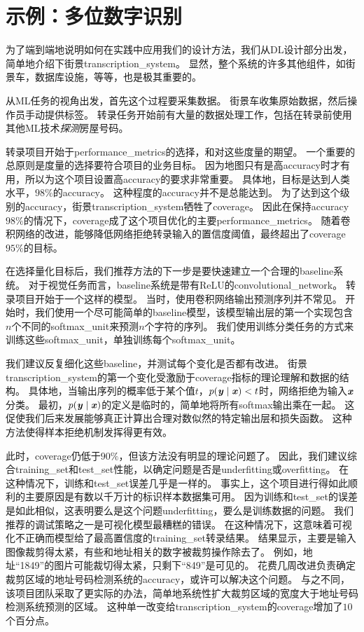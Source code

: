 \section{示例：多位数字识别}
\label{sec:example_multi_digit_number_recognition}
为了端到端地说明如何在实践中应用我们的设计方法，我们从\gls{DL}设计部分出发，简单地介绍下街景\gls{transcription_system}。
显然，整个系统的许多其他组件，如街景车，数据库设施，等等，也是极其重要的。

从\gls{ML}任务的视角出发，首先这个过程要采集数据。
街景车收集原始数据，然后操作员手动提供标签。
转录任务开始前有大量的数据处理工作，包括在转录前使用其他\gls{ML}技术\emph{探测}房屋号码。

转录项目开始于\gls{performance_metrics}的选择，和对这些度量的期望。
一个重要的总原则是度量的选择要符合项目的业务目标。
因为地图只有是高\gls{accuracy}时才有用，所以为这个项目设置高\gls{accuracy}的要求非常重要。
具体地，目标是达到人类水平，$98\%$的\gls{accuracy}。
这种程度的\gls{accuracy}并不是总能达到。
为了达到这个级别的\gls{accuracy}，街景\gls{transcription_system}牺牲了\gls{coverage}。
因此在保持\gls{accuracy} $98\%$的情况下，\gls{coverage}成了这个项目优化的主要\gls{performance_metrics}。
随着卷积网络的改进，能够降低网络拒绝转录输入的置信度阈值，最终超出了\gls{coverage} $95\%$的目标。


在选择量化目标后，我们推荐方法的下一步是要快速建立一个合理的\gls{baseline}系统。
对于视觉任务而言，\gls{baseline}系统是带有\gls{ReLU}的\gls{convolutional_network}。
转录项目开始于一个这样的模型。
当时，使用卷积网络输出预测序列并不常见。
开始时，我们使用一个尽可能简单的\gls{baseline}模型，该模型输出层的第一个实现包含$n$个不同的\gls{softmax_unit}来预测$n$个字符的序列。
我们使用训练分类任务的方式来训练这些\gls{softmax_unit}，单独训练每个\gls{softmax_unit}。


我们建议反复细化这些\gls{baseline}，并测试每个变化是否都有改进。
街景\gls{transcription_system}的第一个变化受激励于\gls{coverage}指标的理论理解和数据的结构。
具体地，当输出序列的概率低于某个值$t$，$p(\boldsymbol{\mathit{y}}\mid\boldsymbol{\mathit{x}}) < t$时，网络拒绝为输入$\boldsymbol{\mathit{x}}$分类。
最初，$p(\boldsymbol{\mathit{y}}\mid\boldsymbol{\mathit{x}})$的定义是临时的，简单地将所有\gls{softmax}输出乘在一起。
这促使我们后来发展能够真正计算出合理对数似然的特定输出层和损失函数。
这种方法使得样本拒绝机制发挥得更有效。


此时，\gls{coverage}仍低于$90\%$，但该方法没有明显的理论问题了。
因此，我们建议综合\gls{training_set}和\gls{test_set}性能，以确定问题是否是\gls{underfitting}或\gls{overfitting}。
在这种情况下，训练和\gls{test_set}误差几乎是一样的。
事实上，这个项目进行得如此顺利的主要原因是有数以千万计的标识样本数据集可用。
因为训练和\gls{test_set}的误差是如此相似，这表明要么是这个问题\gls{underfitting}，要么是训练数据的问题。
我们推荐的调试策略之一是可视化模型最糟糕的错误。
在这种情况下，这意味着可视化不正确而模型给了最高置信度的\gls{training_set}转录结果。
结果显示，主要是输入图像裁剪得太紧，有些和地址相关的数字被裁剪操作除去了。
例如，地址``1849''的图片可能裁切得太紧，只剩下``849''是可见的。
花费几周改进负责确定裁剪区域的地址号码检测系统的\gls{accuracy}，或许可以解决这个问题。
与之不同，该项目团队采取了更实际的办法，简单地系统性扩大裁剪区域的宽度大于地址号码检测系统预测的区域。
这种单一改变给\gls{transcription_system}的\gls{coverage}增加了$10$个百分点。

